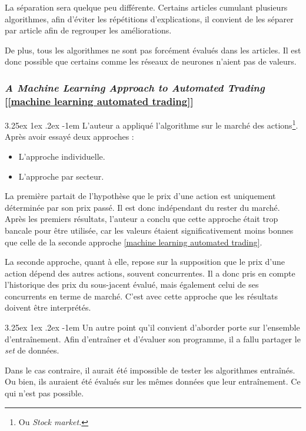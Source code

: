 \documentclass[a4paper, 11pt]{article}
\makeatletter
\newcounter{subsubsubsection}[subsubsection]
\renewcommand\paragraph{\@startsection{paragraph}{5}{\z@}%
  {3.25ex \@plus1ex \@minus.2ex}%
  {-1em}%
  {\normalfont\normalsize\bfseries}}
\makeatother
\begin{document}
La séparation sera quelque peu différente. Certains articles cumulant plusieurs algorithmes, afin d'éviter les répétitions d'explications, il convient de les séparer par article afin de regrouper les améliorations.

De plus, tous les algorithmes ne sont pas forcément évalués dans les articles. Il est donc possible que certains comme les réseaux de neurones n'aient pas de valeurs.

\subsubsection{\textit{A Machine Learning Approach to Automated Trading} [\ref{machine learning automated trading}]}

\paragraph{}
L'auteur a appliqué l'algorithme sur le marché des actions\footnote{Ou \textit{Stock market.}}. Après avoir essayé deux approches :
\begin{itemize}
\item L'approche individuelle.
\item L'approche par secteur.
\end{itemize}

La première partait de l'hypothèse que le prix d'une action est uniquement déterminée par son prix passé. Il est donc indépendant du rester du marché. Après les premiers résultats, l'auteur a conclu que cette approche était trop bancale pour être utilisée, car les valeurs étaient significativement moins bonnes que celle de la seconde approche \ref{machine learning automated trading}.

La seconde approche, quant à elle, repose sur la supposition que le prix d'une action dépend des autres actions, souvent concurrentes. Il a donc pris en compte l'historique des prix du sous-jacent évalué, mais également celui de ses concurrents en terme de marché.
C'est avec cette approche que les résultats doivent être interprétés.

\paragraph{}
Un autre point qu'il convient d'aborder porte sur l'ensemble d'entraînement. Afin d'entraîner et d'évaluer son programme, il a fallu partager le \textit{set} de données.

Dans le cas contraire, il aurait été impossible de tester les algorithmes entraînés. Ou bien, ils auraient été évalués sur les mêmes données que leur entraînement. Ce qui n'est pas possible.
\end{document}
